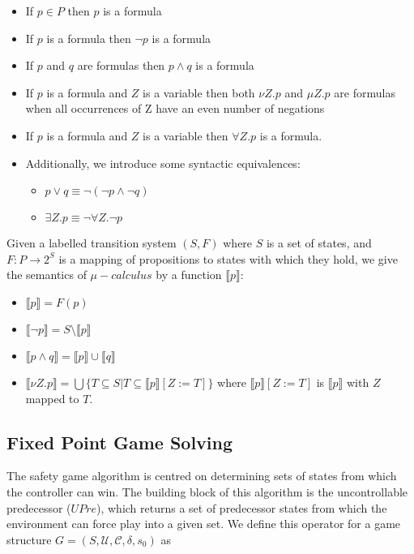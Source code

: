 \begin{itemize}
    \item If $p \in P$ then $p$ is a formula
    \item If $p$ is a formula then $\lnot p$ is a formula
    \item If $p$ and $q$ are formulas then $p \land q$ is a formula
    \item If $p$ is a formula and $Z$ is a variable then both $\nu Z . p$ and $\mu Z . p$ are formulas when all occurrences of Z have an even number of negations
    \item If $p$ is a formula and $Z$ is a variable then $\forall Z . p$ is a formula.
    \item Additionally, we introduce some syntactic equivalences:
        \begin{itemize}
            \item $p \lor q \equiv \lnot ( \lnot p \land \lnot q )$
            \item $\exists Z . p \equiv \lnot \forall Z . \lnot p$
        \end{itemize}
\end{itemize}

Given a labelled transition system $(S, F)$ where $S$ is a set of states, and $F : P \to 2^S$ is a mapping of propositions to states with which they hold, we give the semantics of $\mu-calculus$ by a function $\llbracket p \rrbracket$:

\begin{itemize}
    \item $\llbracket p \rrbracket = F(p)$
    \item $\llbracket \lnot p \rrbracket = S \setminus \llbracket p \rrbracket$
    \item $\llbracket p \land q \rrbracket = \llbracket p \rrbracket \cup \llbracket q \rrbracket$
    \item $\llbracket \nu Z . p \rrbracket = \bigcup \{ T \subseteq S | T \subseteq \llbracket p \rrbracket [ Z := T ] \}$ where $\llbracket p \rrbracket [ Z := T ]$ is $\llbracket p \rrbracket$ with $Z$ mapped to $T$.
\end{itemize}

\subsection{Fixed Point Game Solving}

The safety game algorithm is centred on determining sets of states from which the controller can win. The building block of this algorithm is the uncontrollable predecessor ($UPre$), which returns a set of predecessor states from which the environment can force play into a given set. We define this operator for a game structure $G = (S, \mathcal{U}, \mathcal{C}, \delta, s_0)$ as 

